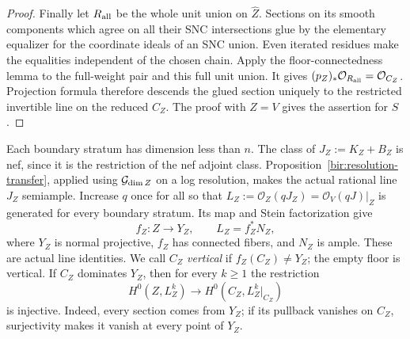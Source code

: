 \begin{proof}
Finally let \(R_{\rm all}\) be the whole unit union on \(\widehat Z\).  Sections
on its smooth components which agree on all their SNC intersections glue
by the elementary equalizer for the coordinate ideals of an SNC union.
Even iterated residues make the equalities independent of the chosen chain.
Apply the floor-connectedness lemma to the full-weight pair and this full
unit union.  It gives
\((p_Z)_*\mathcal O_{R_{\rm all}}=\mathcal O_{C_Z}\).
Projection formula therefore descends the glued section uniquely to the
restricted invertible line on the reduced \(C_Z\).  The proof with \(Z=V\)
gives the assertion for \(S\).
\end{proof}

Each boundary stratum has dimension less than \(n\).  The class of
\(J_Z:=K_Z+B_Z\) is nef, since it is the restriction of the nef adjoint
class.  Proposition~\ref{bir:resolution-transfer}, applied using
\(\mathcal G_{\dim Z}\) on a log resolution, makes the actual rational line
\(J_Z\) semiample.  Increase \(q\) once
for all so that
\(L_Z:=\mathcal O_Z(qJ_Z)=\mathcal O_V(qJ)|_Z\) is generated for every
boundary stratum.  Its map and Stein factorization give
\begin{equation}\label{floor:semiample-map}
 f_Z:Z\longrightarrow Y_Z,\qquad L_Z=f_Z^*N_Z,
\end{equation}
where \(Y_Z\) is normal projective, \(f_Z\) has connected fibers, and
\(N_Z\) is ample.  These are actual line identities.  We call \(C_Z\)
\emph{vertical} if \(f_Z(C_Z)\ne Y_Z\); the empty floor is vertical.
If \(C_Z\) dominates \(Y_Z\), then for every \(k\geq1\) the restriction
\[
 H^0(Z,L_Z^k)\longrightarrow H^0(C_Z,L_Z^k|_{C_Z})
\]
is injective.  Indeed, every section comes from \(Y_Z\); if its pullback
vanishes on \(C_Z\), surjectivity makes it vanish at every point of \(Y_Z\).

